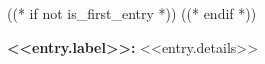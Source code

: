 ((* if not is_first_entry *))
\vspace{<<design.margins.entry_area.vertical_between>>}
((* endif *))

\begin{onecolentry}
    \textbf{<<entry.label>>:} <<entry.details>>
\end{onecolentry}
